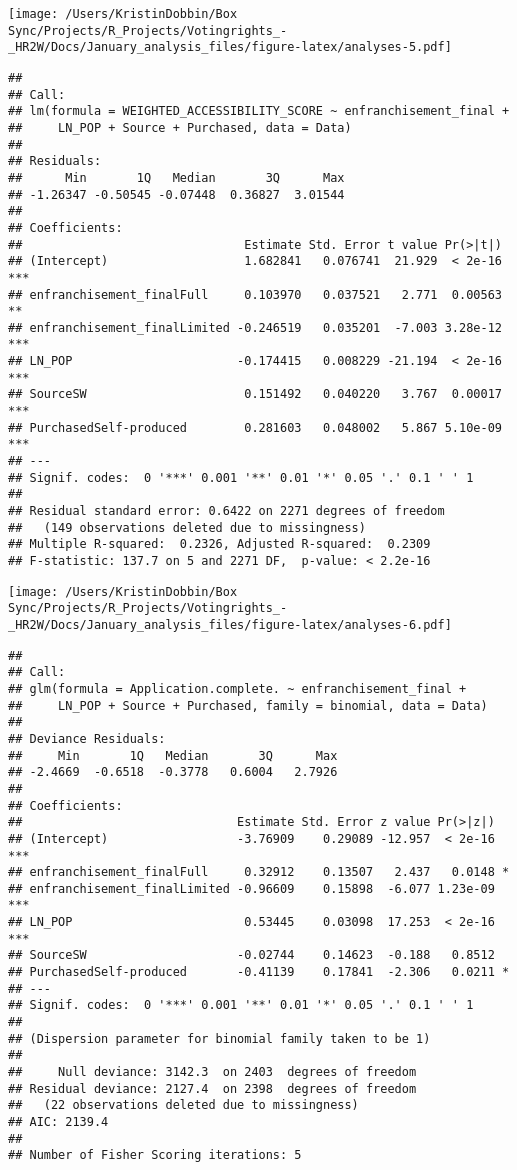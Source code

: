 \documentclass[
]{article}
\begin{document}
\texttt{[image: /Users/KristinDobbin/Box Sync/Projects/R\_Projects/Votingrights\_-\_HR2W/Docs/January\_analysis\_files/figure-latex/analyses-5.pdf]}

\begin{verbatim}
## 
## Call:
## lm(formula = WEIGHTED_ACCESSIBILITY_SCORE ~ enfranchisement_final + 
##     LN_POP + Source + Purchased, data = Data)
## 
## Residuals:
##      Min       1Q   Median       3Q      Max 
## -1.26347 -0.50545 -0.07448  0.36827  3.01544 
## 
## Coefficients:
##                               Estimate Std. Error t value Pr(>|t|)    
## (Intercept)                   1.682841   0.076741  21.929  < 2e-16 ***
## enfranchisement_finalFull     0.103970   0.037521   2.771  0.00563 ** 
## enfranchisement_finalLimited -0.246519   0.035201  -7.003 3.28e-12 ***
## LN_POP                       -0.174415   0.008229 -21.194  < 2e-16 ***
## SourceSW                      0.151492   0.040220   3.767  0.00017 ***
## PurchasedSelf-produced        0.281603   0.048002   5.867 5.10e-09 ***
## ---
## Signif. codes:  0 '***' 0.001 '**' 0.01 '*' 0.05 '.' 0.1 ' ' 1
## 
## Residual standard error: 0.6422 on 2271 degrees of freedom
##   (149 observations deleted due to missingness)
## Multiple R-squared:  0.2326, Adjusted R-squared:  0.2309 
## F-statistic: 137.7 on 5 and 2271 DF,  p-value: < 2.2e-16
\end{verbatim}

\texttt{[image: /Users/KristinDobbin/Box Sync/Projects/R\_Projects/Votingrights\_-\_HR2W/Docs/January\_analysis\_files/figure-latex/analyses-6.pdf]}

\begin{verbatim}
## 
## Call:
## glm(formula = Application.complete. ~ enfranchisement_final + 
##     LN_POP + Source + Purchased, family = binomial, data = Data)
## 
## Deviance Residuals: 
##     Min       1Q   Median       3Q      Max  
## -2.4669  -0.6518  -0.3778   0.6004   2.7926  
## 
## Coefficients:
##                              Estimate Std. Error z value Pr(>|z|)    
## (Intercept)                  -3.76909    0.29089 -12.957  < 2e-16 ***
## enfranchisement_finalFull     0.32912    0.13507   2.437   0.0148 *  
## enfranchisement_finalLimited -0.96609    0.15898  -6.077 1.23e-09 ***
## LN_POP                        0.53445    0.03098  17.253  < 2e-16 ***
## SourceSW                     -0.02744    0.14623  -0.188   0.8512    
## PurchasedSelf-produced       -0.41139    0.17841  -2.306   0.0211 *  
## ---
## Signif. codes:  0 '***' 0.001 '**' 0.01 '*' 0.05 '.' 0.1 ' ' 1
## 
## (Dispersion parameter for binomial family taken to be 1)
## 
##     Null deviance: 3142.3  on 2403  degrees of freedom
## Residual deviance: 2127.4  on 2398  degrees of freedom
##   (22 observations deleted due to missingness)
## AIC: 2139.4
## 
## Number of Fisher Scoring iterations: 5
\end{verbatim}
\end{document}
